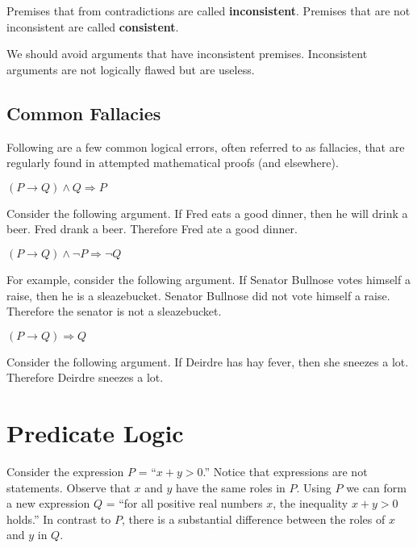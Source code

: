 \documentclass[a4paper,english,12pt]{article}
\begin{document}
\begin{defn} Premises that from contradictions are called \textbf{inconsistent}.  Premises that are not inconsistent are called \textbf{consistent}.
\end{defn}
\begin{rem}We should avoid arguments that have inconsistent premises. Inconsistent arguments are not logically flawed but are useless.
\end{rem}


\subsection{Common Fallacies}
Following are a few common logical errors, often referred to as fallacies, that are
regularly found in attempted mathematical proofs (and elsewhere).
\begin{defn} $(P\rightarrow Q) \wedge Q \Rightarrow P$
\end{defn}
\begin{exmp} Consider the following argument. If Fred eats a good dinner, then he will drink a beer. Fred drank a beer. Therefore Fred ate a good dinner.
\end{exmp}
\begin{defn} $(P \rightarrow Q) \wedge \neg P \Rightarrow \neg Q$
\end{defn}
\begin{exmp} For example, consider the following argument. If Senator Bullnose votes himself a raise, then he is a sleazebucket. Senator Bullnose did not vote himself a raise. Therefore the senator is not a sleazebucket.
\end{exmp}
\begin{defn} $(P \rightarrow Q) \Rightarrow Q$
\end{defn}
\begin{exmp} Consider the following argument. If Deirdre has hay fever, then she sneezes a lot. Therefore Deirdre sneezes a lot.
\end{exmp}

\section{Predicate Logic}
Consider the expression $P$ = ``$x+y > 0$.'' Notice that expressions are not statements. Observe that $x$ and $y$ have the same roles in $P$. Using $P$ we can form a new expression $Q$ = ``for all positive real numbers $x$, the inequality $x+y > 0$ holds.'' In contrast to $P$, there is a substantial difference between the roles of $x$ and $y$ in $Q$. 
\end{document}
